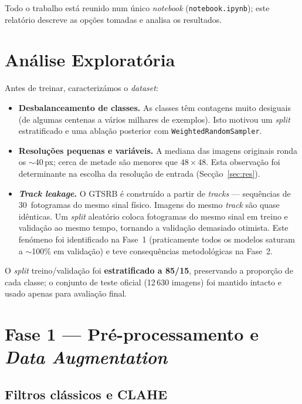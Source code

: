 \documentclass[11pt,a4paper]{article}
\begin{document}
Todo o trabalho está reunido num único \emph{notebook} (\texttt{notebook.ipynb}); este
relatório descreve as opções tomadas e analisa os resultados.

\section{Análise Exploratória}

Antes de treinar, caracterizámos o \emph{dataset}:

\begin{itemize}[nosep]
  \item \textbf{Desbalanceamento de classes.} As classes têm contagens muito desiguais
  (de algumas centenas a vários milhares de exemplos). Isto motivou um \emph{split}
  estratificado e uma ablação posterior com \texttt{WeightedRandomSampler}.
  \item \textbf{Resoluções pequenas e variáveis.} A mediana das imagens originais ronda
  os $\sim$40\,px; cerca de metade são menores que $48\times48$. Esta observação foi
  determinante na escolha da resolução de entrada (Secção~\ref{sec:res}).
  \item \textbf{\emph{Track leakage}.} O GTSRB é construído a partir de \emph{tracks} ---
  sequências de 30~fotogramas do mesmo sinal físico. Imagens do mesmo \emph{track} são
  quase idênticas. Um \emph{split} aleatório coloca fotogramas do mesmo sinal em treino e
  validação ao mesmo tempo, tornando a validação demasiado otimista. Este fenómeno foi
  identificado na Fase~1 (praticamente todos os modelos saturam a $\sim$100\% em
  validação) e teve consequências metodológicas na Fase~2.
\end{itemize}

O \emph{split} treino/validação foi \textbf{estratificado a 85/15}, preservando a
proporção de cada classe; o conjunto de teste oficial (12\,630 imagens) foi mantido
intacto e usado apenas para avaliação final.

\section{Fase 1 --- Pré-processamento e \emph{Data Augmentation}}

\subsection{Filtros clássicos e CLAHE}
\end{document}
